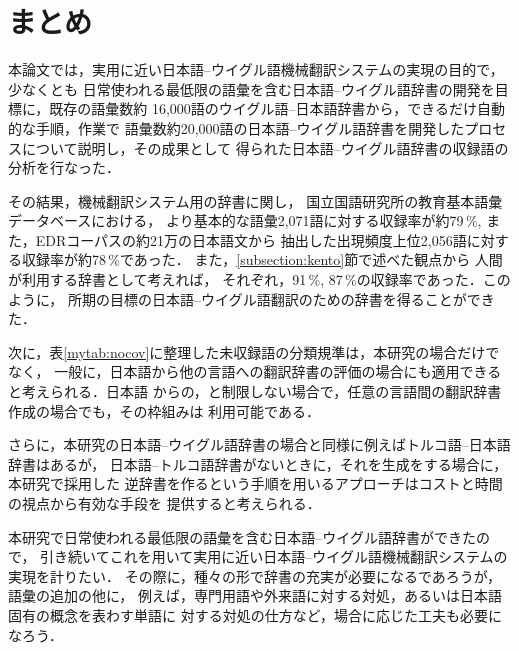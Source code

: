 {\section{まとめ}\label{section:owari}
本論文では，実用に近い日本語--ウイグル語機械翻訳システムの実現の目的で，少なくとも
日常使われる最低限の語彙を含む日本語--ウイグル語辞書の開発を目標に，既存の語彙数約
16,000語のウイグル語--日本語辞書\cite{UJDIC}から，できるだけ自動的な手順，作業で
語彙数約20,000語の日本語--ウイグル語辞書を開発したプロセスについて説明し，その成果として
得られた日本語--ウイグル語辞書の収録語の分析を行なった．

その結果，機械翻訳システム用の辞書に関し，
国立国語研究所の教育基本語彙データベース\cite{KOKKEN}における，
より基本的な語彙2,071語に対する収録率が約79\,\%, 
また，EDRコーパスの約21万の日本語文から
抽出した出現頻度上位2,056語に対する収録率が約78\,\%であった．
また，\ref{subsection:kento}節で述べた観点から
人間が利用する辞書として考えれば，
それぞれ，91\,\%, 87\,\%の収録率であった．このように，
所期の目標の日本語--ウイグル語翻訳のための辞書を得ることができた．

次に，表\ref{mytab:nocov}に整理した未収録語の分類規準は，本研究の場合だけでなく，
一般に，日本語から他の言語への翻訳辞書の評価の場合にも適用できると考えられる．日本語
からの，と制限しない場合で，任意の言語間の翻訳辞書作成の場合でも，その枠組みは
利用可能である．

さらに，本研究の日本語--ウイグル語辞書の場合と同様に例えばトルコ語--日本語辞書はあるが，
日本語--トルコ語辞書がないときに，それを生成をする場合に，本研究で採用した
逆辞書を作るという手順を用いるアプローチはコストと時間の視点から有効な手段を
提供すると考えられる．

本研究で日常使われる最低限の語彙を含む日本語--ウイグル語辞書ができたので，
引き続いてこれを用いて実用に近い日本語--ウイグル語機械翻訳システムの実現を計りたい．
その際に，種々の形で辞書の充実が必要になるであろうが，語彙の追加の他に，
例えば，専門用語や外来語に対する対処，あるいは日本語固有の概念を表わす単語に
対する対処の仕方など，場合に応じた工夫も必要になろう．





}
